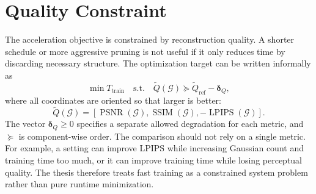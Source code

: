 \section{Quality Constraint}

The acceleration objective is constrained by reconstruction quality. A shorter schedule or more aggressive pruning is not useful if it only reduces time by discarding necessary structure. The optimization target can be written informally as
\begin{equation}
\min T_{\mathrm{train}}
\quad
\mathrm{s.t.}
\quad
\widetilde{Q}(\mathcal{G})
\succeq
\widetilde{Q}_{\mathrm{ref}}-\boldsymbol{\delta}_Q,
\end{equation}
where all coordinates are oriented so that larger is better:
\begin{equation}
\widetilde{Q}(\mathcal{G})
=
\left[
\operatorname{PSNR}(\mathcal{G}),
\operatorname{SSIM}(\mathcal{G}),
-\operatorname{LPIPS}(\mathcal{G})
\right].
\end{equation}
The vector $\boldsymbol{\delta}_Q\ge 0$ specifies a separate allowed degradation for each metric, and $\succeq$ is component-wise order. The comparison should not rely on a single metric. For example, a setting can improve LPIPS while increasing Gaussian count and training time too much, or it can improve training time while losing perceptual quality. The thesis therefore treats fast training as a constrained system problem rather than pure runtime minimization.

